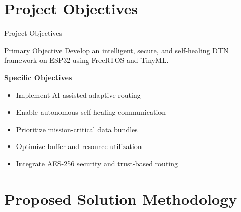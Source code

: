 \documentclass[11pt,aspectratio=43]{beamer}
\begin{document}
\section{Project Objectives}

\begin{frame}{Project Objectives}

\begin{block}{Primary Objective}
Develop an intelligent, secure, and self-healing DTN framework on ESP32 using FreeRTOS and TinyML.
\end{block}

\vspace{0.2cm}

\textbf{Specific Objectives}
\begin{itemize}
    \item Implement AI-assisted adaptive routing
    \item Enable autonomous self-healing communication
    \item Prioritize mission-critical data bundles
    \item Optimize buffer and resource utilization
    \item Integrate AES-256 security and trust-based routing
\end{itemize}

\end{frame}

\section{Proposed Solution Methodology}
\end{document}
